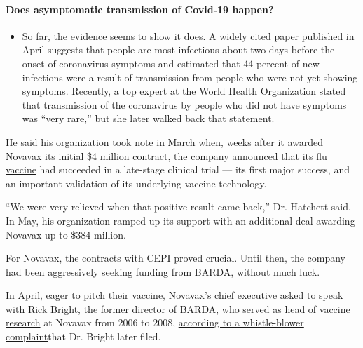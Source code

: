 \begin{itemize}
{  \paragraph{Does asymptomatic transmission of Covid-19
  happen?}\label{does-asymptomatic-transmission-of-covid-19-happen}}

  \begin{itemize}
  \tightlist
  \item
    So far, the evidence seems to show it does. A widely cited
    \href{https://www.nature.com/articles/s41591-020-0869-5}{paper}
    published in April suggests that people are most infectious about
    two days before the onset of coronavirus symptoms and estimated that
    44 percent of new infections were a result of transmission from
    people who were not yet showing symptoms. Recently, a top expert at
    the World Health Organization stated that transmission of the
    coronavirus by people who did not have symptoms was ``very rare,''
    \href{https://www.nytimes3xbfgragh.onion/2020/06/09/world/coronavirus-updates.html?action=click\&pgtype=Article\&state=default\&region=MAIN_CONTENT_3\&context=storylines_faq\#link-1f302e21}{but
    she later walked back that statement.}
  \end{itemize}
\end{itemize}

He said his organization took note in March when, weeks after
\href{https://ir.novavax.com/news-releases/news-release-details/novavax-awarded-funding-cepi-covid-19-vaccine-development}{it
awarded Novavax} its initial \$4 million contract, the company
\href{https://ir.novavax.com/news-releases/news-release-details/novavax-nanoflu-achieves-all-primary-endpoints-phase-3-clinical}{announced
that its flu vaccine} had succeeded in a late-stage clinical trial ---
its first major success, and an important validation of its underlying
vaccine technology.

``We were very relieved when that positive result came back,'' Dr.
Hatchett said. In May, his organization ramped up its support with an
additional deal awarding Novavax up to \$384 million.

For Novavax, the contracts with CEPI proved crucial. Until then, the
company had been aggressively seeking funding from BARDA, without much
luck.

In April, eager to pitch their vaccine, Novavax's chief executive asked
to speak with Rick Bright, the former director of BARDA, who served as
\href{https://ir.novavax.com/news-releases/news-release-details/novavax-appoints-new-vice-president-vaccine-research}{head
of vaccine research} at Novavax from 2006 to 2008,
\href{https://www.cnn.com/2020/05/05/politics/rick-bright-full-complaint/index.html}{according
to a whistle-blower complaint}that Dr. Bright later filed.

